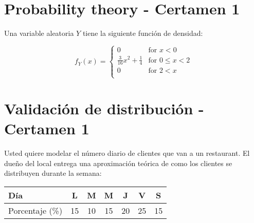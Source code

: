 \documentclass[11pt]{exam}
\begin{document}
%
%
%
\begin{questions}
\section*{Probability theory - Certamen 1}
\addpoints
\question Una variable aleatoria $Y$ tiene la siguiente funci\'on de densidad:

 \[f_Y(x)=
\begin{cases}
0&\text{for $x < 0$}\\
\frac{3}{16}x^2+\frac{1}{4}& \text{for $0\leq x < 2$}\\
0&\text{for $2 < x$}\\
\end{cases}
\]


\newpage
\section*{Validaci\'on de distribuci\'on - Certamen 1}

\question Usted quiere modelar el n\'umero diario de clientes que van a un restaurant. El due\~no del local entrega una aproximaci\'on te\'orica de como los clientes se distribuyen durante la semana:

\begin{table}[!htbp]
\centering
\begin{tabular}{lcccccc}
\toprule
D\'ia&L&M&M&J&V&S\\
\midrule
Porcentaje (\%) & 15 & 10 & 15 & 20 & 25 & 15\\
\bottomrule
\end{tabular}
\end{table}


\end{questions}
\end{document}
